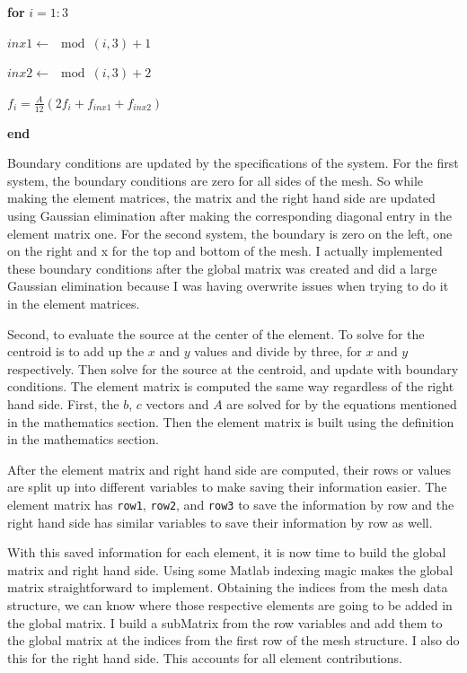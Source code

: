 \documentclass[11pt, oneside]{article}   	%
\begin{document}
\textbf{for} $i = 1:3$

\quad $inx1 \leftarrow \mod (i,3) + 1$

\quad $inx2 \leftarrow \mod(i,3) + 2$

\quad $f_i = \frac{A}{12} ( 2 f_i + f_{inx1} + f_{inx2})$

\textbf{end}

Boundary conditions are updated by the specifications of the system. For the first system, the boundary conditions are zero for all sides of the mesh. So while making the element matrices, the matrix and the right hand side are updated using Gaussian elimination after making the corresponding diagonal entry in the element matrix one. For the second system, the boundary is zero on the left, one on the right and x for the top and bottom of the mesh. I actually implemented these boundary conditions after the global matrix was created and did a large Gaussian elimination because I was having overwrite issues when trying to do it in the element matrices. 

Second, to evaluate the source at the center of the element. To solve for the centroid is to add up the $x$ and $y$ values and divide by three, for $x$ and $y$ respectively. Then solve for the source at the centroid, and update with boundary conditions. The element matrix is computed the same way regardless of the right hand side. First, the $b$, $c$ vectors and $A$ are solved for by the equations mentioned in the mathematics section. Then the element matrix is built using the definition in the mathematics section. 

After the element matrix and right hand side are computed, their rows or values are split up into different variables to make saving their information easier. The element matrix has \texttt{row1}, \texttt{row2}, and \texttt{row3} to save the information by row and the right hand side has similar variables to save their information by row as well. 

With this saved information for each element, it is now time to build the global matrix and right hand side. Using some Matlab indexing magic makes the global matrix straightforward to implement. Obtaining the indices from the mesh data structure, we can know where those respective elements are going to be added in the global matrix. I build a subMatrix from the row variables and add them to the global matrix at the indices from the first row of the mesh structure. I also do this for the right hand side. This accounts for all element contributions. 
\end{document}
